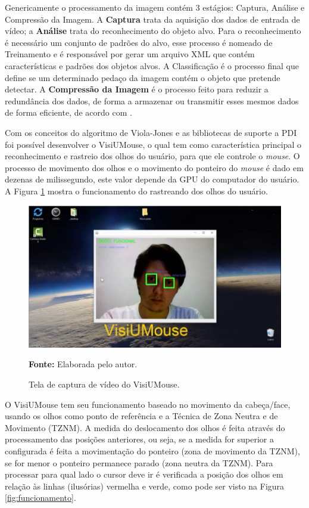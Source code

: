Genericamente o processamento da imagem contém 3 estágios: Captura, Análise e Compressão da Imagem. A \textbf{Captura} trata da aquisição dos dados de entrada de vídeo; a \textbf{Análise} trata do reconhecimento do objeto alvo. Para o reconhecimento é necessário um conjunto de padrões do alvo, esse processo é nomeado de Treinamento e é responsável por gerar um arquivo XML que contém características e padrões dos objetos alvos. A Classificação é o processo final que define se um determinado pedaço da imagem contém o objeto que pretende detectar. A \textbf{Compressão da Imagem} é o processo feito para reduzir a redundância dos dados, de forma a armazenar ou transmitir esses mesmos dados de forma eficiente, de acordo com .

Com os conceitos do algoritmo de Viola-Jones e as bibliotecas de suporte a PDI foi possível desenvolver o VisiUMouse, o qual tem como característica principal o reconhecimento e rastreio dos olhos do usuário, para  que ele controle o \textit{mouse}. O processo de movimento dos olhos e o movimento do ponteiro do \textit{mouse} é dado em dezenas de milissegundo, este valor depende da GPU do computador do usuário. A Figura \ref{fig:visiumouse-1} mostra o funcionamento do rastreando dos olhos do usuário.

\begin{figure}[htbp]
\centering
\caption{Tela de captura de vídeo do VisiUMouse.}

\includegraphics[scale=.6]{img/visiumouse-1.png}

  {\fontsize{11}{11}\selectfont \textbf{Fonte:} Elaborada pelo autor.}
\label{fig:visiumouse-1}
\end{figure}

O VisiUMouse tem seu funcionamento baseado no movimento da cabeça/face, usando os olhos como ponto de referência e a Técnica de Zona Neutra e de Movimento (TZNM). A medida do deslocamento dos olhos é feita através do processamento das posições anteriores, ou seja, se a medida for superior a configurada é feita a movimentação do ponteiro (zona de movimento da TZNM), se for menor o ponteiro permanece parado (zona neutra da TZNM). Para processar para qual lado o cursor deve ir é verificada a posição dos olhos em relação às linhas (ilusórias) vermelha e verde, como pode ser visto na Figura \ref{fig:funcionamento}.

